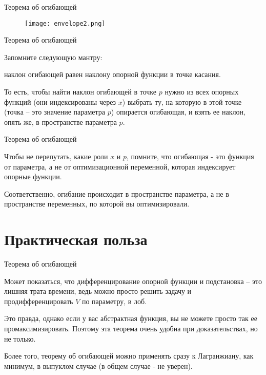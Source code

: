 \documentclass{beamer}
\begin{document}
\begin{frame}{Теорема об огибающей}

\begin{figure}[hbt]
\centering
\texttt{[image: envelope2.png]}
\end{figure}

\end{frame}

\begin{frame}{Теорема об огибающей}

Запомните следующую мантру: 

\alert{наклон огибающей равен наклону опорной функции в точке касания}. 

То есть, чтобы найти наклон огибающей в точке $p$ нужно из всех опорных функций (они индексированы через $x$) выбрать ту, на которую в этой точке (точка – это значение параметра $p$) опирается огибающая, и взять ее наклон, опять же, в пространстве параметра $p$. 

\end{frame}

\begin{frame}{Теорема об огибающей}

Чтобы не перепутать, какие роли $x$ и $p$, помните, что \alert{огибающая - это функция от параметра}, а не от оптимизационной переменной, которая индексирует опорные функции. 

Соответственно, \alert{огибание происходит в пространстве параметра, а не в пространстве переменных, по которой вы оптимизировали}.

\end{frame}

\section{Практическая польза}

\begin{frame}{Теорема об огибающей}

Может показаться, что дифференцирование опорной функции и подстановка – это лишняя трата времени, ведь можно просто решить задачу и продифференцировать $V$ по параметру, в лоб.

Это правда, однако если у вас абстрактная функция, вы не можете просто так ее промаксимизировать. Поэтому эта теорема очень удобна при доказательствах, но не только. 

Более того, теорему об огибающей можно применять сразу к Лагранжиану, как минимум, в выпуклом случае (в общем случае - не уверен).

\end{frame}
\end{document}
